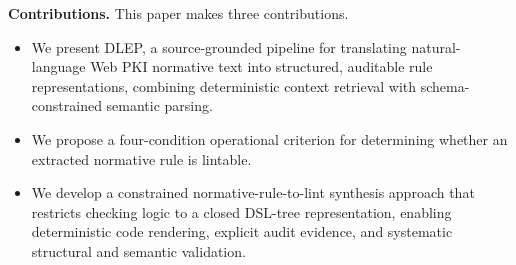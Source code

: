 \noindent\textbf{Contributions.}
This paper makes three contributions.
\begingroup
\setlength{\itemsep}{0pt}
\setlength{\topsep}{2pt}
\setlength{\parsep}{0pt}
\begin{itemize}
    \item 
    We present DLEP, a source-grounded pipeline for translating natural-language Web PKI normative text into structured, auditable rule representations, combining deterministic context retrieval with schema-constrained semantic parsing.
    \item We propose a four-condition operational criterion for determining whether an extracted normative rule is lintable.
    \item 
    We develop a constrained normative-rule-to-lint synthesis approach that restricts checking logic to a closed DSL-tree representation, enabling deterministic code rendering, explicit audit evidence, and systematic structural and semantic validation.
\end{itemize}
\endgroup
